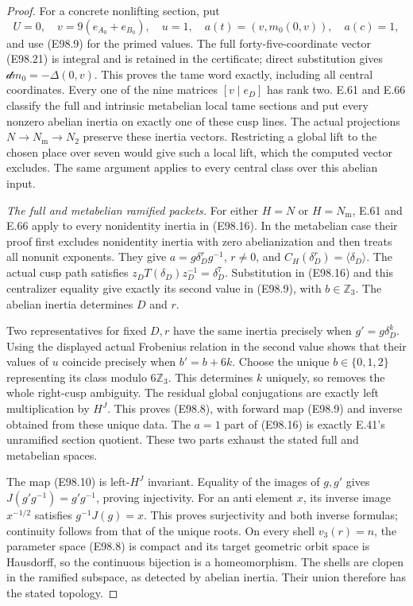 \begin{proof}
For a concrete nonlifting section, put
\[
 U=0,\quad v=9(e_{A_0}+e_{B_0}),\quad
 u=1,\quad a(t)=(v,m_0(0,v)),\quad a(c)=1,
 \tag{E98.27}
\]
and use (E98.9) for the primed values. The full
forty-five-coordinate vector (E98.21) is integral
and is retained in the certificate; direct
substitution gives $\mathcal dm_0=-\Delta(0,v)$.
This proves the tame word exactly, including all
central coordinates. Every one of the nine matrices
$[v\mid e_D]$ has rank two. E.61 and E.66 classify
the full and intrinsic metabelian local tame
sections and put every nonzero abelian inertia
on exactly one of these cusp lines. The actual
projections $N\to N_{\mathrm m}\to N_2$ preserve
these inertia vectors. Restricting a global lift
to the chosen place over seven would give such
a local lift, which the computed vector excludes.
The same argument applies to every central class
over this abelian input.

\emph{The full and metabelian ramified packets.}
For either $H=N$ or $H=N_{\mathrm m}$, E.61 and
E.66 apply to every nonidentity inertia in
(E98.16). In the metabelian case their proof
first excludes nonidentity inertia with zero
abelianization and then treats all nonunit
exponents. They give
$a=g\delta_D^r g^{-1}$, $r\ne0$, and
$C_H(\delta_D^r)=\langle\delta_D\rangle$.
The actual cusp path satisfies
$z_DT(\delta_D)z_D^{-1}=\delta_D^7$.
Substitution in (E98.16) and this centralizer
equality give exactly its second value in
(E98.9), with $b\in\mathbb Z_3$.
The abelian inertia determines $D$ and $r$.

Two representatives for fixed $D,r$ have the
same inertia precisely when $g'=g\delta_D^k$.
Using the displayed actual Frobenius relation
in the second value shows that their values
of $u$ coincide precisely when $b'=b+6k$.
Choose the unique $b\in\{0,1,2\}$ representing
its class modulo $6\mathbb Z_3$. This determines
$k$ uniquely, so removes the whole right-cusp
ambiguity. The residual global conjugations
are exactly left multiplication by $H^J$.
This proves (E98.8), with forward map (E98.9)
and inverse obtained from these unique data.
The $a=1$ part of (E98.16) is exactly E.41's
unramified section quotient. These two parts
exhaust the stated full and metabelian spaces.

The map (E98.10) is left-$H^J$ invariant.
Equality of the images of $g,g'$ gives
$J(g'g^{-1})=g'g^{-1}$, proving injectivity.
For an anti element $x$, its inverse image
$x^{-1/2}$ satisfies $g^{-1}J(g)=x$.
This proves surjectivity and both inverse
formulas; continuity follows from that of
the unique roots. On every shell
$v_3(r)=n$, the parameter space (E98.8) is
compact and its target geometric orbit
space is Hausdorff, so the continuous
bijection is a homeomorphism. The shells
are clopen in the ramified subspace, as
detected by abelian inertia. Their union
therefore has the stated topology.


\end{proof}
